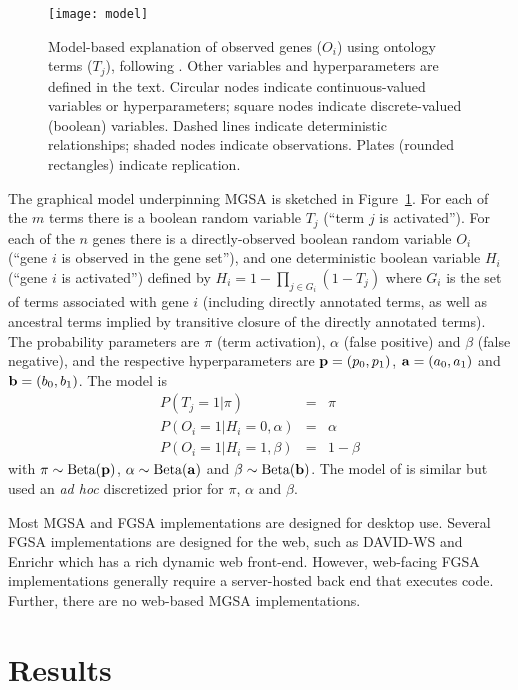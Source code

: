 \begin{figure}
\texttt{[image: model]}
\caption{
  \label{fig:model}
  Model-based explanation of observed genes ($O_i$) using ontology terms ($T_j$), following \cite{pmid20172960}.
  Other variables and hyperparameters are defined in the text.
  Circular nodes indicate continuous-valued variables or hyperparameters;
  square nodes indicate discrete-valued (boolean) variables.
  Dashed lines indicate deterministic relationships;
  shaded nodes indicate observations.
  Plates (rounded rectangles) indicate replication.
}
\end{figure}

The graphical model underpinning MGSA is sketched in Figure~\ref{fig:model}.
For each of the $m$ terms there
is a boolean random variable
$T_j$ (``term $j$ is activated'').
For each of the $n$ genes there is a directly-observed boolean random variable
$O_i$ (``gene $i$ is observed in the gene set''),
and one deterministic boolean variable
$H_i$ (``gene $i$ is activated'')
defined by $H_i = 1 - \prod_{j \in G_i} (1 - T_j)$
where $G_i$ is the set of terms associated with gene $i$
(including directly annotated terms, as well as ancestral terms implied by transitive closure of the directly annotated terms).
The probability parameters are $\pi$ (term activation), $\alpha$ (false positive) and $\beta$ (false negative),
and the respective hyperparameters are ${\bf p}=(p_0,p_1)$, ${\bf a}=(a_0,a_1)$ and ${\bf b}=(b_0,b_1)$.
The model is
\begin{eqnarray*}
P(T_j=1|\pi) & = & \pi \\
P(O_i=1|H_i=0,\alpha) & = & \alpha \\
P(O_i=1|H_i=1,\beta) & = & 1-\beta
\end{eqnarray*}
with
$\pi \sim \mbox{Beta}({\bf p})$,
$\alpha \sim \mbox{Beta}({\bf a})$ and
$\beta \sim \mbox{Beta}({\bf b})$.
The model of \cite{pmid20172960} is similar but used an
{\em ad hoc} discretized prior for $\pi$, $\alpha$ and $\beta$.

Most MGSA and FGSA implementations are designed for desktop use.
Several FGSA implementations are designed for the web, such as
DAVID-WS \citep{pmid22543366} and
Enrichr \citep{pmid23586463,pmid25971742,pmid27141961}
which has a rich dynamic web front-end.
However, web-facing FGSA implementations generally require a server-hosted back end that executes code.
Further, there are no web-based MGSA implementations.

\section*{Results}

